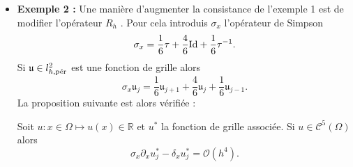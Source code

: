 \begin{itemize}
\item \textbf{Exemple 2 :} Une manière d'augmenter la consistance de l'exemple 1 est de modifier l'opérateur $R_h$ \cite{Collatz2012}. Pour cela introduis $\sigma_x$ l'opérateur de Simpson
\begin{equation}
\sigma_x = \dfrac{1}{6} \tau + \dfrac{4}{6} \Id + \dfrac{1}{6} \tau^{-1}.
\end{equation}
Si $\mathfrak{u} \in l^2_{h,\per}$ est une fonction de grille alors
\begin{equation}
\sigma_x \mathfrak{u}_j = \dfrac{1}{6} \mathfrak{u}_{j+1} + \dfrac{4}{6} \mathfrak{u}_j + \dfrac{1}{6} \mathfrak{u}_{j-1} .
\end{equation}
La proposition suivante est alors vérifiée :
\begin{proposition}
Soit $u : x \in \Omega \mapsto u(x) \in \mathbb{R}$ et $u^*$ la fonction de grille associée. Si $u \in \mathcal{C}^5(\Omega)$ alors 
\begin{equation}
\sigma_x \partial_x u^*_j - \delta_x u^*_j = \mathcal{O}(h^4).
\end{equation}
\label{prop:eq_deltax2_sigmax}
\end{proposition}


\end{itemize}
